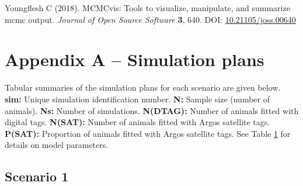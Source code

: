 \documentclass[
]{article}
\begin{document}
\leavevmode\hypertarget{ref-Youngflesh2018}{}%
Youngflesh C (2018). MCMCvis: Tools to visualize, manipulate, and summarize mcmc output. \emph{Journal of Open Source Software} \textbf{3}, 640. DOI: \href{https://doi.org/10.21105/joss.00640}{10.21105/joss.00640}

\pagebreak

\hypertarget{appendix-appendix}{%
\appendix}


\hypertarget{appendix-a-simulation-plans}{%
\section{Appendix A -- Simulation plans}\label{appendix-a-simulation-plans}}

\hypertarget{appendixa}{}

Tabular summaries of the simulation plans for each scenario are given below. \textbf{sim:} Unique simulation identification number. \textbf{N:} Sample size (number of animals). \textbf{Ns:} Number of simulations. \textbf{N(DTAG):} Number of animals fitted with digital tags. \textbf{N(SAT):} Number of animals fitted with Argos satellite tags. \textbf{P(SAT):} Proportion of animals fitted with Argos satellite tags. See Table \hyperlink{tab1}{1} for details on model parameters.

\subsection{Scenario 1}
\end{document}
